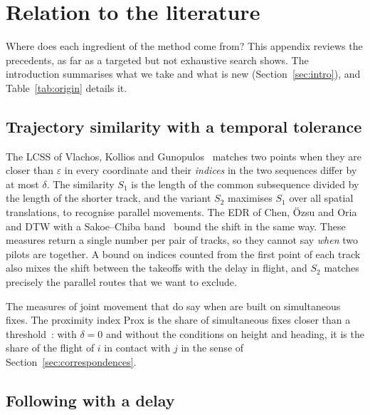 \section{Relation to the literature}\label{sec:literature}

Where does each ingredient of the method come from? This appendix reviews the precedents, as far
as a targeted but not exhaustive search shows. The introduction summarises what we take and what is
new (Section~\ref{sec:intro}), and Table~\ref{tab:origin} details it.

\subsection{Trajectory similarity with a temporal tolerance}

The LCSS of Vlachos, Kollios and Gunopulos~\cite{vlachos2002} matches two points when they are
closer than $\varepsilon$ in every coordinate and their \emph{indices} in the two sequences differ
by at most $\delta$. The similarity $S_1$ is the length of the common subsequence divided by the
length of the shorter track, and the variant $S_2$ maximises $S_1$ over all spatial translations,
to recognise parallel movements. The EDR of Chen, Özsu and Oria~\cite{chen2005} and DTW with a
Sakoe--Chiba band~\cite{sakoe1978} bound the shift in the same way. These measures return a
single number per pair of tracks, so they cannot say \emph{when} two pilots are together. A bound
on indices counted from the first point of each track also mixes
the shift between the takeoffs with the delay in flight, and $S_2$ matches precisely the parallel
routes that we want to exclude.

The measures of joint movement that do say when are built on simultaneous fixes. The proximity
index Prox is the share of simultaneous fixes closer than a threshold~\cite[§3.1]{joo2018}: with
$\delta=0$ and without the conditions on height and heading, it is the share of the flight of $i$
in contact with $j$ in the sense of Section~\ref{sec:correspondences}.

\subsection{Following with a delay}\label{sec:following}

